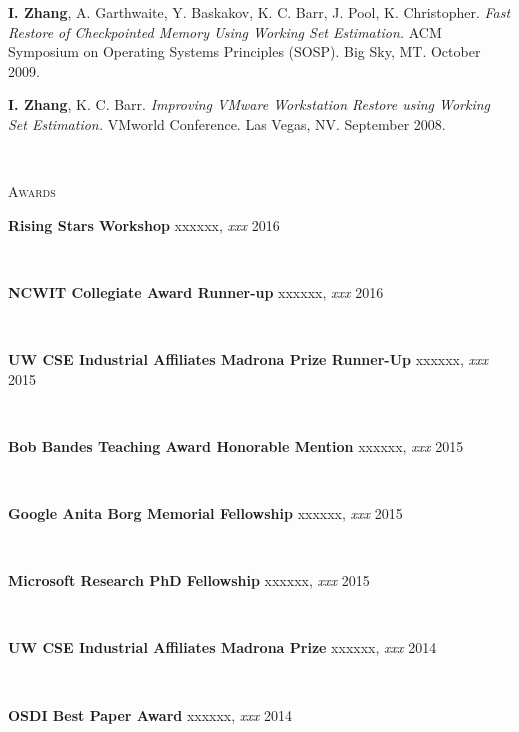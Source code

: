 \documentclass[10pt,times]{report}
\newlength{\sectiongap}
\newlength{\entrygap}
\newlength{\sectioncolwidth}
\newlength{\colgap}
\newlength{\stuffwidth}
\def\ifEqString#1#2{\def\testa{#1}\def\testb{#2}%
  \ifx\testa\testb}
\newenvironment{rtable}{
  \begin{minipage}{\textwidth}
  }{
  \end{minipage}
}
\newenvironment{rentry}[3][xxx]{
  \begin{minipage}[t]{\hsize}
    \textbf{#2}\ifEqString{#1}{xxx}\relax\else, \textit{#1}\fi
    \hspace{\stretch{1}} #3 \\
  }{
    \removelastskip
  \end{minipage}
  \\[\entrygap]  %
}
\newenvironment{rsection}[1]{
  \begin{minipage}[t]{\sectioncolwidth}
    \textsc{#1}
  \end{minipage}
  \hspace{\colgap}
  \begin{minipage}[t]{\stuffwidth}
  }{
    \removelastskip
  \end{minipage}
  \\[\sectiongap]
}
\begin{document}
\begin{rtable}
  \begin{rsection}{}
    \textbf{I. Zhang}, A. Garthwaite, Y. Baskakov, K. C. Barr, J.
    Pool, K. Christopher. \textit{Fast Restore of Checkpointed Memory
      Using Working Set Estimation.} ACM Symposium on Operating
    Systems Principles (SOSP).  Big Sky, MT. October
    2009.\\\vspace{-0.5em}

    \textbf{I. Zhang}, K. C. Barr.  \textit{Improving VMware
      Workstation Restore using Working Set Estimation.}  VMworld
    Conference. Las Vegas, NV. September 2008.\\
  \end{rsection}

  \begin{rsection}{Awards}
    \begin{rentry}{Rising Stars Workshop}{2016}
      \vspace{-0.5em}
    \end{rentry} 
    \begin{rentry}{NCWIT Collegiate Award Runner-up}{2016}
      \vspace{-0.5em}
    \end{rentry} 
    \begin{rentry}{UW CSE Industrial Affiliates Madrona Prize Runner-Up}{2015}
      \vspace{-0.5em}
    \end{rentry} 
    \begin{rentry}{Bob Bandes Teaching Award Honorable Mention}{2015}
      \vspace{-0.5em}
    \end{rentry} 
    \begin{rentry}{Google Anita Borg Memorial Fellowship}{2015}
      \vspace{-0.5em}
    \end{rentry} 
    \begin{rentry}{Microsoft Research PhD Fellowship}{2015}
      \vspace{-0.5em}
    \end{rentry} 
    \begin{rentry}{UW CSE Industrial Affiliates Madrona Prize}{2014}
       \vspace{-0.5em}
    \end{rentry}
    \begin{rentry}{OSDI Best Paper Award}{2014}
      \vspace{-0.5em}

\end{rentry}
\end{rsection}
\end{rtable}
\end{document}
